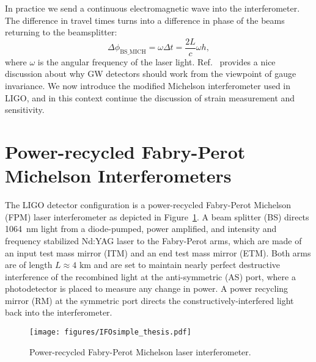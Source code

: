 In practice we send a continuous electromagnetic wave into the
interferometer. The difference in travel times turns into a difference
in phase of the beams returning to the beamsplitter:
\begin{equation}
\Delta \phi_{\mathrm{BS\_MICH}} = \omega \Delta t = \frac{2 L}{c} \omega h,
\label{eq:deltaphi_mich}
\end{equation}
where $\omega$ is the angular frequency of the laser
light. Ref.~\cite{Garfinkle2005Gauge} provides a nice discussion about
why GW detectors should work from the viewpoint of gauge
invariance. We now introduce the modified Michelson interferometer
used in LIGO, and in this context continue the discussion of strain
measurement and sensitivity.


\section{Power-recycled Fabry-Perot Michelson Interferometers} 
The LIGO detector configuration is a power-recycled Fabry-Perot
Michelson (FPM) laser interferometer as depicted in
Figure~\ref{fig:IFOschematic}. A beam splitter (BS) directs 1064~nm
light from a diode-pumped, power amplified, and intensity and
frequency stabilized Nd:YAG laser to the Fabry-Perot arms, which
are made of an input test mass mirror (ITM) and an end test mass
mirror (ETM). Both arms are of length $L \approx 4 \text{ km}$ and are
set to maintain nearly perfect destructive interference of the
recombined light at the anti-symmetric (AS) port, where a
photodetector is placed to measure any change in power. A power
recycling mirror (RM) at the symmetric port directs the
constructively-interfered light back into the interferometer.

\begin{figure}
\begin{centering}
\texttt{[image: figures/IFOsimple\_thesis.pdf]}
\caption[Power-recycled Fabry-Perot Michelson laser
interferometer]{Power-recycled Fabry-Perot Michelson laser
  interferometer.}
\label{fig:IFOschematic}
\end{centering}
\end{figure}

